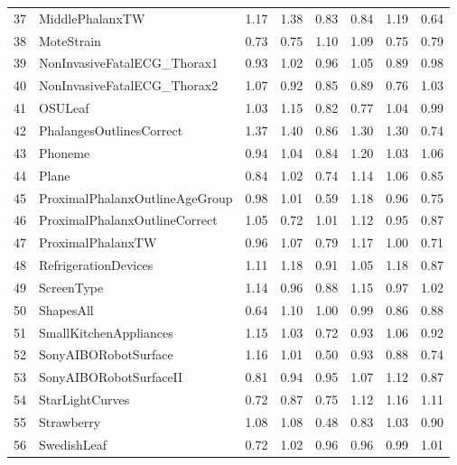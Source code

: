 \begin{longtable}{llllllll}
	37 &                 MiddlePhalanxTW &  1.17 &  1.38 &       0.83 &  0.84 &  1.19 &  0.64 \\
	38 &                      MoteStrain &  0.73 &  0.75 &       1.10 &  1.09 &  0.75 &  0.79 \\
	39 &     NonInvasiveFatalECG\_Thorax1 &  0.93 &  1.02 &       0.96 &  1.05 &  0.89 &  0.98 \\
	40 &     NonInvasiveFatalECG\_Thorax2 &  1.07 &  0.92 &       0.85 &  0.89 &  0.76 &  1.03 \\
	41 &                         OSULeaf &  1.03 &  1.15 &       0.82 &  0.77 &  1.04 &  0.99 \\
	42 &        PhalangesOutlinesCorrect &  1.37 &  1.40 &       0.86 &  1.30 &  1.30 &  0.74 \\
	43 &                         Phoneme &  0.94 &  1.04 &       0.84 &  1.20 &  1.03 &  1.06 \\
	44 &                           Plane &  0.84 &  1.02 &       0.74 &  1.14 &  1.06 &  0.85 \\
	45 &  ProximalPhalanxOutlineAgeGroup &  0.98 &  1.01 &       0.59 &  1.18 &  0.96 &  0.75 \\
	46 &   ProximalPhalanxOutlineCorrect &  1.05 &  0.72 &       1.01 &  1.12 &  0.95 &  0.87 \\
	47 &               ProximalPhalanxTW &  0.96 &  1.07 &       0.79 &  1.17 &  1.00 &  0.71 \\
	48 &            RefrigerationDevices &  1.11 &  1.18 &       0.91 &  1.05 &  1.18 &  0.87 \\
	49 &                      ScreenType &  1.14 &  0.96 &       0.88 &  1.15 &  0.97 &  1.02 \\
	50 &                       ShapesAll &  0.64 &  1.10 &       1.00 &  0.99 &  0.86 &  0.88 \\
	51 &          SmallKitchenAppliances &  1.15 &  1.03 &       0.72 &  0.93 &  1.06 &  0.92 \\
	52 &            SonyAIBORobotSurface &  1.16 &  1.01 &       0.50 &  0.93 &  0.88 &  0.74 \\
	53 &          SonyAIBORobotSurfaceII &  0.81 &  0.94 &       0.95 &  1.07 &  1.12 &  0.87 \\
	54 &                 StarLightCurves &  0.72 &  0.87 &       0.75 &  1.12 &  1.16 &  1.11 \\
	55 &                      Strawberry &  1.08 &  1.08 &       0.48 &  0.83 &  1.03 &  0.90 \\
	56 &                     SwedishLeaf &  0.72 &  1.02 &       0.96 &  0.96 &  0.99 &  1.01 \\

\end{longtable}
